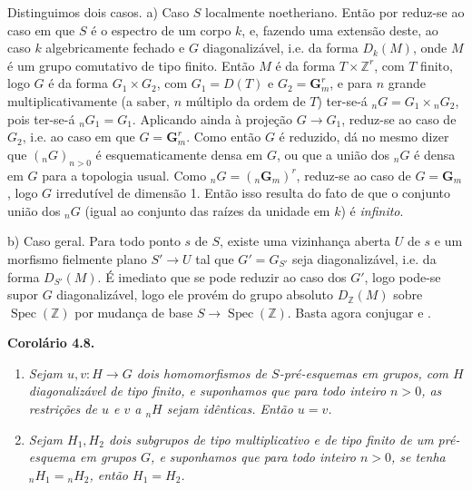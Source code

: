 Distinguimos dois casos.
a) Caso \(S\)
localmente noetheriano. Então por
 reduz-se ao caso em
que \(S\) é o espectro de um corpo \(k\), e, fazendo uma extensão
deste, ao caso \(k\) algebricamente fechado e \(G\)
diagonalizável, i.e. da forma \(D_k(M)\), onde \(M\) é um grupo
comutativo de tipo finito. Então \(M\) é da forma \(T\times\mathbb Z^r\), com \(T\)
finito, logo \(G\) é da forma \(G_1\times G_2\), com
\(G_1=D(T)\) e \(G_2=\mathbf G_m^r\), e para \(n\) grande
multiplicativamente (a saber, \(n\) múltiplo da ordem de \(T\))
ter-se-á \({}_nG=G_1\times{}_nG_2\), pois ter-se-á
\({}_nG_1=G_1\). Aplicando ainda
 à projeção
\(G\to G_1\), reduz-se ao caso de \(G_2\), i.e. ao caso em que
\(G=\mathbf G_m^r\). Como então \(G\) é reduzido, dá no mesmo
dizer que \(({}_nG)_{n>0}\) é esquematicamente densa em \(G\),
ou que a união dos \({}_nG\) é densa em \(G\) para a topologia
usual. Como \({}_nG=({}_n\mathbf G_m)^r\), reduz-se ao caso de
\(G=\mathbf G_m\), logo \(G\) irredutível de dimensão 1. Então
isso resulta do fato de que o conjunto união dos \({}_nG\)
(igual ao conjunto das raízes da unidade em \(k\)) é
\emph{infinito}.

b) Caso geral.
Para todo ponto \(s\) de \(S\), existe uma vizinhança aberta
\(U\) de \(s\) e um morfismo fielmente plano \(S'\to U\) tal
que \(G'=G_{S'}\) seja diagonalizável, i.e. da forma \(D_{S'}(M)\).
É imediato que se pode reduzir ao caso dos \(G'\), logo pode-se
supor \(G\) diagonalizável, logo ele provém do grupo absoluto
\(D_{\mathbb Z}(M)\) sobre \(\operatorname{Spec}(\mathbb Z)\)
por mudança de base \(S\to\operatorname{Spec}(\mathbb Z)\).
Basta agora conjugar
 e
.

\medskip
\noindent{}\textbf{Corolário 4.8.}
\begin{enumerate}
  \item[a)]
  \textit{Sejam \(u,v:H\to G\) dois homomorfismos de
  \(S\)-pré-esquemas em grupos, com \(H\) diagonalizável de tipo
  finito, e suponhamos que para todo inteiro \(n>0\), as restrições
  de \(u\) e \(v\) a \({}_nH\) sejam idênticas. Então \(u=v\).}

  \item[b)]
  \textit{Sejam \(H_1,H_2\) dois subgrupos de tipo multiplicativo
  e de tipo finito de um pré-esquema em grupos \(G\), e suponhamos
  que para todo inteiro \(n>0\), se tenha \({}_nH_1={}_nH_2\),
  então \(H_1=H_2\).}
\end{enumerate}

